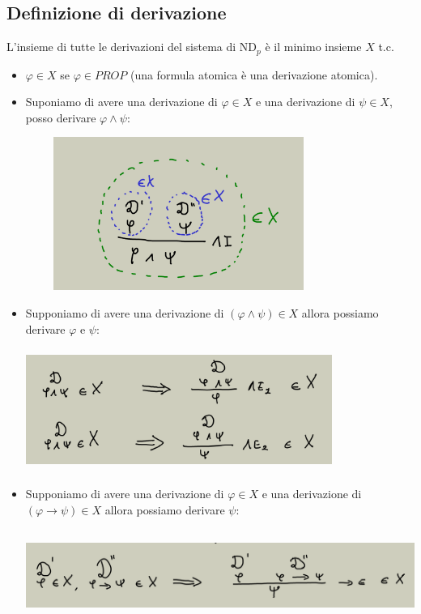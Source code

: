 \documentclass[a4paper,12pt]{report}
\begin{document}
\subsection{Definizione di derivazione}

L'insieme di tutte le derivazioni del sistema di ND$_p$ \`{e} il minimo insieme $X$ t.c.
\begin{itemize}
\item $\varphi \in X$ se $\varphi \in PROP$ (una formula atomica \`{e} una derivazione atomica).
\item Suponiamo di avere una derivazione di $\varphi \in X$ e una derivazione di $\psi \in X$, posso derivare $\varphi \wedge \psi$:
\begin{center}
\includegraphics[width=10cm, height=5cm]{def1}
\end{center}
\item Supponiamo di avere una derivazione di $(\varphi \wedge \psi) \in X$ allora possiamo derivare $\varphi$ e $\psi$:
\begin{center}
\includegraphics[width=10cm, height=4cm]{def2}
\end{center}
\item Supponiamo di avere una derivazione di $\varphi \in X$ e una derivazione di $(\varphi \to \psi) \in X$ allora possiamo derivare $\psi$:
\begin{center}
\includegraphics[width=13cm, height=3cm]{def3}

\end{center}
\end{itemize}
\end{document}
